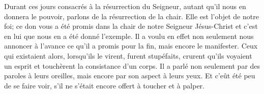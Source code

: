 Durant ces jours consacrés à la résurrection du Seigneur,
	autant qu’il nous en donnera le pouvoir,
	parlons de la résurrection de la chair.
Elle est l’objet de notre foi;
	ce don vous a été promis dans la chair de notre Seigneur Jésus-Christ
	et c’est en lui que nous en a été donné l’exemple.
Il a voulu en effet
	non seulement nous annoncer à l’avance ce qu’il a promis pour la fin,
	mais encore le manifester.
Ceux qui existaient alors, lorsqu’ils le virent, furent stupéfaits,
	crurent qu’ils voyaient un esprit et touchèrent la consistance d’un corps.
Il a parlé non seulement par des paroles à leurs oreilles,
	mais encore par son aspect à leurs yeux.
Et c’eût été peu de se faire voir,
	s’il ne s’était encore offert à toucher et à palper.
